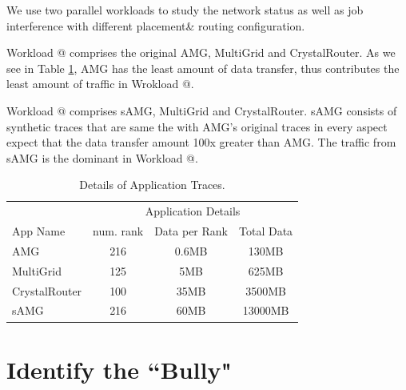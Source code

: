 \documentclass[conference,compsoc]{IEEEtran}
\makeatletter
\newcommand{\Rmnum}[1]{\expandafter\@slowromancap\romannumeral #1@}
\makeatother
\begin{document}
We use two parallel workloads to study the network status as well as job interference with different placement\& routing configuration. 

Workload \Rmnum{1} comprises the original AMG, MultiGrid and CrystalRouter. As we see in Table \ref{tab:apps-detail}, AMG has the least amount of data transfer, thus contributes the least amount of traffic in Wrokload \Rmnum{1}.

Workload \Rmnum{2} comprises sAMG, MultiGrid and CrystalRouter. sAMG consists of synthetic traces that are same the with AMG's original traces in every aspect expect that the data transfer amount 100x greater than AMG. The traffic from sAMG is the dominant in Workload \Rmnum{2}.


\begin{table}[ht]
\begin{center}
\caption{Details of Application Traces.} 
\label{tab:apps-detail}
\begin{tabular}{l c c c }
\toprule %
\toprule
&\multicolumn{3}{c}{Application Details} \\ %
\cmidrule(l){2-4}
App Name & num. rank & Data per Rank & Total Data\\ %
\midrule %
AMG  &    216 &   0.6MB   &     130MB\\ %
\midrule
MultiGrid  &    125 &   5MB   &     625MB\\ 
\midrule
CrystalRouter  &   100  &  35MB    &     3500MB\\ 
\midrule
sAMG  &    216 &   60MB   &     13000MB\\ %
\midrule %
\bottomrule %
\end{tabular}
\end{center}
\end{table}


\section{Identify the ``Bully"}
\label{sec:workload-1}
\end{document}
